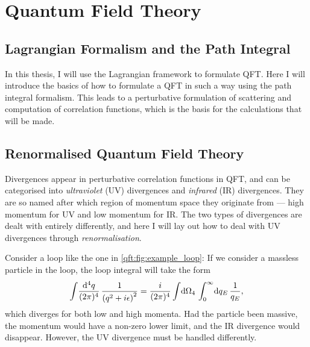 \documentclass[../main.tex]{subfiles}
\begin{document}
\chapter{Quantum Field Theory}

\section{Lagrangian Formalism and the Path Integral}

In this thesis, I will use the Lagrangian framework to formulate QFT. Here I
will introduce the basics of how to formulate a QFT in such a way using the
path integral formalism. This leads to a perturbative formulation of scattering
and computation of correlation functions, which is the basis for the
calculations that will be made. \medskip

\section{Renormalised Quantum Field Theory}


Divergences appear in perturbative correlation functions in QFT, and can be
categorised into \emph{ultraviolet} (UV) divergences and \emph{infrared} (IR)
divergences. They are so named after which region of momentum space they
originate from --- high momentum for UV and low momentum for IR. The two types
of divergences are dealt with entirely differently, and here I will lay out how
to deal with UV divergences through \emph{renormalisation}. \medskip

Consider a loop like the one in \cref{qft:fig:example_loop}: If we consider a
massless particle in the loop, the loop integral will take the form
\begin{equation}
    \label{qft:eq:example_loop}
    \loopintegral[4]{q} \frac{1}{\pclosed{q^2 + i\epsilon}^2} = \frac{i}{(2\pi)^4} \integral{\Omega_4} \integral[_0^\infty]{q_E} \frac{1}{q_E},
\end{equation}
which diverges for both low and high momenta.  Had the particle been massive, the momentum would have a non-zero lower limit, and the IR divergence would disappear.
However, the UV divergence must be handled differently.
\end{document}
